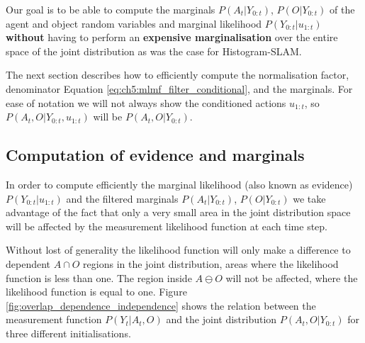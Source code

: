


Our goal is to be able to compute the marginals $P(A_t|Y_{0:t})$, $P(O|Y_{0:t})$ of the agent and object random variables and 
marginal likelihood $P(Y_{0:t}|u_{1:t})$ \textbf{without} having to perform an \textbf{expensive marginalisation} over the entire space of the joint distribution 
as was the case for Histogram-SLAM. 

The next section describes how to efficiently compute the normalisation factor, denominator Equation \ref{eq:ch5:mlmf_filter_conditional}, and the marginals.
For ease of notation we will not always show the conditioned actions $u_{1:t}$, so $P(A_t,O|Y_{0:t},u_{1:t})$ will 
be $P(A_t,O|Y_{0:t})$.



\subsection{Computation of evidence and marginals}

In order to compute efficiently the marginal likelihood (also known as evidence) $P(Y_{0:t}|u_{1:t})$ and the filtered  marginals $P(A_t|Y_{0:t})$,
$P(O|Y_{0:t})$ we take advantage of the fact that only a very small area 
in the joint distribution space will be affected by the measurement likelihood function at each time step.

Without lost of generality the likelihood function will only make a difference to dependent $A \cap O$ regions in the joint distribution, areas 
where the likelihood function is less than one. The region inside $A \ominus O$ will not be affected, where the likelihood function 
is equal to one.
Figure \ref{fig:overlap_dependence_independence} shows the relation between the measurement 
function $P(Y_t|A_t,O)$ and the joint distribution $P(A_t,O|Y_{0:t})$ for three different initialisations. 

